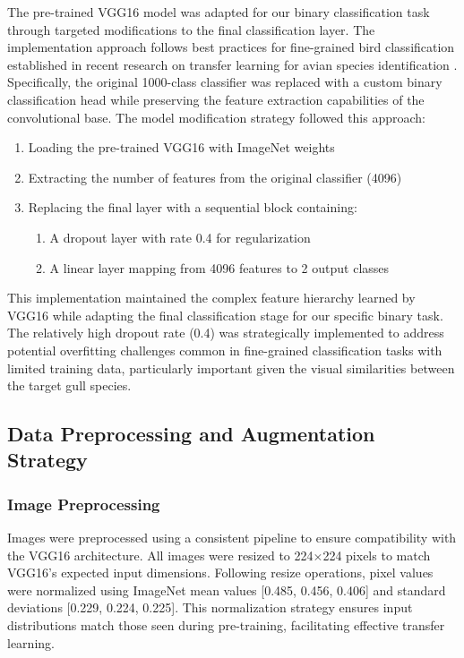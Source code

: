 The pre-trained VGG16 model was adapted for our binary classification task through targeted modifications to the final classification layer. The implementation approach follows best practices for fine-grained bird classification established in recent research on transfer learning for avian species identification \citep{ghani2024comprehensive, reslan2022automatic}. Specifically, the original 1000-class classifier was replaced with a custom binary classification head while preserving the feature extraction capabilities of the convolutional base. The model modification strategy followed this approach:

\begin{enumerate}
    \item Loading the pre-trained VGG16 with ImageNet weights
    \item Extracting the number of features from the original classifier (4096)
    \item Replacing the final layer with a sequential block containing:
    \begin{enumerate}
        \item A dropout layer with rate 0.4 for regularization
        \item A linear layer mapping from 4096 features to 2 output classes
    \end{enumerate}
\end{enumerate}

This implementation maintained the complex feature hierarchy learned by VGG16 while adapting the final classification stage for our specific binary task. The relatively high dropout rate (0.4) was strategically implemented to address potential overfitting challenges common in fine-grained classification tasks with limited training data, particularly important given the visual similarities between the target gull species.

\subsection{Data Preprocessing and Augmentation Strategy}

\subsubsection{Image Preprocessing}

Images were preprocessed using a consistent pipeline to ensure compatibility with the VGG16 architecture. All images were resized to 224$\times$224 pixels to match VGG16's expected input dimensions. Following resize operations, pixel values were normalized using ImageNet mean values [0.485, 0.456, 0.406] and standard deviations [0.229, 0.224, 0.225]. This normalization strategy ensures input distributions match those seen during pre-training, facilitating effective transfer learning.

